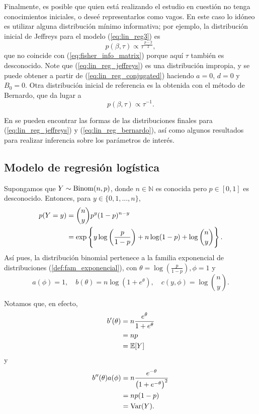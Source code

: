 Finalmente, es posible que quien está realizando el estudio en cuestión no tenga conocimientos iniciales, o deseé representarlos como vagos. En este caso lo idóneo es utilizar alguna distribución mínimo informativa; por ejemplo, la distribución inicial de Jeffreys para el modelo (\ref{eq:lin_reg3}) es
\begin{equation} \label{eq:lin_reg_jeffreys}
	p(\beta, \tau) \propto \tau^{\frac{p-2}{2}},
\end{equation}
que no coincide con (\ref{eq:fisher_info_matrix}) porque aquí $\tau$ también es desconocido. Note que (\ref{eq:lin_reg_jeffreys}) es una distribución impropia, y se puede obtener a partir de (\ref{eq:lin_reg_conjugated}) haciendo $a = 0$, $d = 0$ y $B_0 = 0$. Otra distribución inicial de referencia es la obtenida con el método de Bernardo, que da lugar a 
\begin{equation} \label{eq:lin_reg_bernardo}
	p(\beta, \tau) \propto \tau^{-1}.
\end{equation}

En \cite[pp.~16~-18]{notas_lm_egp} se pueden encontrar las formas de las distribuciones finales para (\ref{eq:lin_reg_jeffreys}) y (\ref{eq:lin_reg_bernardo}), así como algunos resultados para realizar inferencia sobre los parámetros de interés.



\subsection{Modelo de regresión logística}

Supongamos que $Y \sim \mathrm{Binom}(n, p)$, donde $n \in \mathbb{N}$ es conocida pero $p \in [0,1]$ es desconocido. Entonces, para $y \in \{0, 1, ..., n \}$,
\begin{align*}
	p(Y = y) &= \binom{n}{y} p^y (1-p)^{n-y} \\
    	     &= \mathrm{exp} \left\{ y \log \left( \frac{p}{1-p} \right) + n \log (1-p) + \log \binom{n}{y} \right\}.
\end{align*}
Así pues, la distribución binomial pertenece a la familia exponencial de distribuciones (\ref{def:fam_exponencial}), con $\theta = \log \left( \frac{p}{1-p} \right), \phi = 1$ y
\begin{equation*}
	a(\phi) = 1, \quad b(\theta) = n \log \left( 1 + e^{\theta} \right), \quad c(y, \phi) = \log \binom{n}{y}.
\end{equation*}

Notamos que, en efecto,
\begin{align*}
	b'(\theta) &= n \frac{ e^\theta }{ 1 + e^\theta} \\
               &= np \\
               &= \mathbb{E}[Y]
\end{align*}
y
\begin{align*}
	b''(\theta)a(\phi) &= n \frac{ e^{-\theta} }{ \left( 1 + e^{-\theta} \right)^2 } \\
    &= np(1-p) \\
    &= \mathrm{Var} (Y).
\end{align*}



